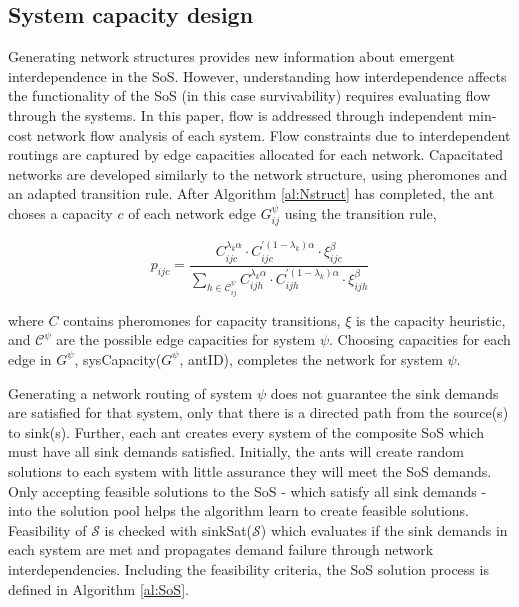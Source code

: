 \documentclass[preprint,12pt,authoryear]{elsarticle}
\begin{document}
\subsection{System capacity design}
Generating network structures provides new information about emergent interdependence in the SoS. However, understanding how interdependence affects the functionality of the SoS (in this case survivability) requires evaluating flow through the systems. In this paper, flow is addressed through independent min-cost network flow analysis of each system. Flow constraints due to interdependent routings are captured by edge capacities allocated for each network.   Capacitated networks are developed similarly to the network structure, using pheromones and an adapted transition rule. After Algorithm \ref{al:Nstruct} has completed, the ant choses a capacity $c$ of each network edge $G^\psi_{ij}$ using the transition rule,

\begin{equation}
p_{ijc}=\frac{C_{ijc}^{\lambda_k\alpha}\cdot C_{ijc}^{'(1-\lambda_k)\alpha}\cdot\xi_{ijc}^{\beta}}{\sum_{h\in\mathcal{C}^{\psi}_{ij}}C_{ijh}^{\lambda_k\alpha}\cdot C_{ijh}^{'(1-\lambda_k)\alpha}\cdot\xi_{ijh}^{\beta}}
\label{eq:Cap}
\end{equation}

\noindent where $C$ contains pheromones for capacity transitions, $\xi$ is the capacity heuristic, and $\mathcal{C}^{\psi}$ are the possible edge capacities for system $\psi$. Choosing capacities for each edge in $G^\psi$, sysCapacity($G^\psi$, antID), completes the network for system $\psi$.  

Generating a network routing of system $\psi$ does not guarantee the sink demands are satisfied for that system, only that there is a directed path from the source(s) to sink(s). Further, each ant creates every system of the composite SoS which must have all sink demands satisfied. Initially, the ants will create random solutions to each system with little assurance they will meet the SoS demands. Only accepting feasible solutions to the SoS - which satisfy all sink demands - into the solution pool helps the algorithm learn to create feasible solutions. Feasibility of $\mathcal{S}$ is checked with sinkSat($\mathcal{S}$) which evaluates if the sink demands in each system are met and propagates demand failure through network interdependencies. Including the feasibility criteria, the SoS solution process is defined in Algorithm \ref{al:SoS}.
\end{document}
